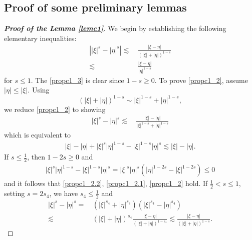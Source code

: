 \documentclass[10pt,twoside,a4paper]{article}
\numberwithin{equation}{section}\allowdisplaybreaks
\def\leq{\leqslant}
\def\geq{\geqslant}
\begin{document}
	
	\begin{appendices} 
		\section{Proof of some preliminary lemmas}	\label{appa}
		\begin{proof}[\textbf{Proof of the Lemma \ref{lemc1}}]
			We begin by establishing the following elementary inequalities:	
			\begin{align}
				\left||\xi|^s-|\eta|^s\right| \lesssim &\,\frac{|\xi-\eta|}{\left(|\xi|+|\eta|\right)^{1-s}} \label{propc1_2}\\
				\lesssim &\, \frac{|\xi-\eta|}{|\eta|^{1-s}}  \label{propc1_3}
			\end{align}
			for $ s\leq 1. $ The \eqref{propc1_3}  is clear since  $ 1-s\geq 0. $ To prove  \eqref{propc1_2}, assume$ |\eta| \leq |\xi|  $. Using
			$$ \left(|\xi|+|\eta|\right)^{1-s} \sim |\xi|^{1-s}+|\eta|^{1-s},  $$
		we reduce \eqref{propc1_2} to showing
			\begin{align}
				|\xi|^s-|\eta|^s \lesssim &\,\frac{|\xi|-|\eta|}{|\xi|^{1-s}+|\eta|^{1-s}} \label{propc1_2.1}
			\end{align}
			which is equivalent to
			\begin{align} \label{propc1_2.2}
				|\xi|-|\eta| +|\xi|^s |\eta|^{1-s}-|\xi|^{1-s}|\eta|^s \lesssim |\xi|-|\eta|.
			\end{align}
			If $ s\leq \frac 12 $, then $ 1-2s\geq 0 $ and  
			\begin{align*}
				|\xi|^s |\eta|^{1-s}-|\xi|^{1-s}|\eta|^s= |\xi|^s |\eta|^s \left( |\eta|^{1-2s}-|\xi|^{1-2s}\right) \leq 0
			\end{align*}
			and it follows that \eqref{propc1_2.2}, \eqref{propc1_2.1}, \eqref{propc1_2} hold.  If $ \frac 12 <s\leq 1  $, setting $ s=2s_4 $, we have   $ s_4\leq \frac 12 $ and 
			\begin{align}
				|\xi|^s-|\eta|^s =&\,\left(	|\xi|^{s_4}+|\eta|^{s_4} \right)\left(	|\xi|^{s_4}-|\eta|^{s_4} \right)\nonumber\\
				\lesssim &\, \left(|\xi|+|\eta|\right)^{s_4}\frac{|\xi-\eta|}{\left(|\xi|+|\eta|\right)^{1-s_4}}\lesssim\frac{|\xi-\eta|}{\left(|\xi|+|\eta|\right)^{1-s}}. \nonumber
			\end{align}
			
			
			
			
			

\end{proof}
\end{appendices}
\end{document}
